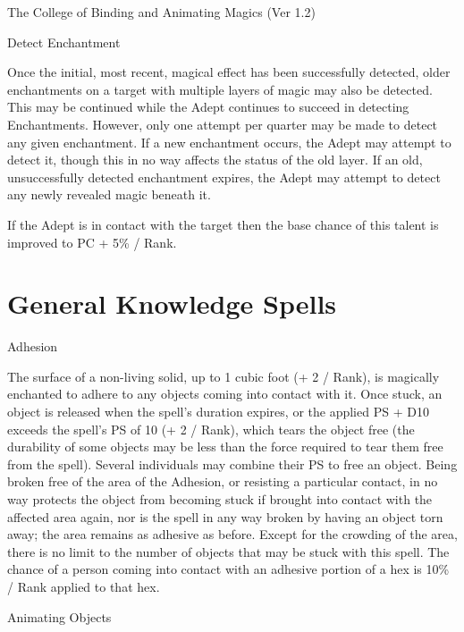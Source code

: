 \begin{Chapter}{The College of Binding and Animating Magics (Ver 1.2)}
\begin{talent}[T-2]{Detect Enchantment}
\begin{effects}
Once the initial, most recent, magical effect has been successfully
detected, older enchantments on a target with multiple layers of magic
may also be detected.  This may be continued while the Adept continues
to succeed in detecting Enchantments.  However, only one attempt per
quarter may be made to detect any given enchantment.  If a new
enchantment occurs, the Adept may attempt to detect it, though this in
no way affects the status of the old layer.  If an old, unsuccessfully
detected enchantment expires, the Adept may attempt to detect any
newly revealed magic beneath it.

If the Adept is in contact with the target then the base chance of
this talent is improved to PC + 5\% / Rank.
\end{effects}
\end{talent}

\section{General Knowledge Spells}

\begin{spell}[G-1]{Adhesion}

\begin{effects}
The surface of a non-living solid, up to 1 cubic foot (+ 2 / Rank), is
magically enchanted to adhere to any objects coming into contact with
it.  Once stuck, an object is released when the spell’s duration
expires, or the applied PS + D10 exceeds the spell’s PS of 10 (+ 2 /
Rank), which tears the object free (the durability of some objects may
be less than the force required to tear them free from the spell).
Several individuals may combine their PS to free an object. Being
broken free of the area of the Adhesion, or resisting a particular
contact, in no way protects the object from becoming stuck if brought
into contact with the affected area again, nor is the spell in any way
broken by having an object torn away; the area remains as adhesive as
before. Except for the crowding of the area, there is no limit to the
number of objects that may be stuck with this spell. The chance of a
person coming into contact with an adhesive portion of a hex is 10\% /
Rank applied to that hex.
\end{effects}
\end{spell}

\begin{spell}[G-2]{Animating Objects}


\end{spell}
\end{Chapter}
